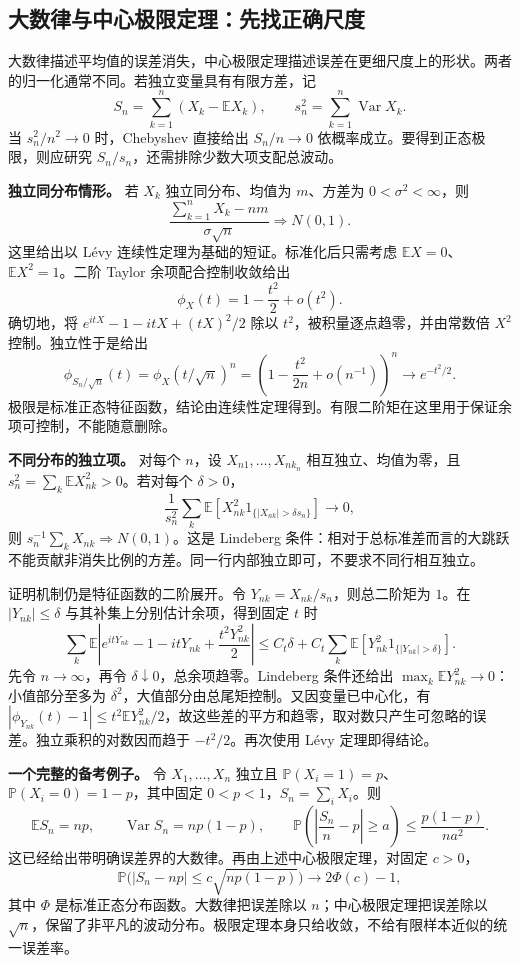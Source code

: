 \subsection{大数律与中心极限定理：先找正确尺度}

\label{app:probability-limit}

大数律描述平均值的误差消失，中心极限定理描述误差在更细尺度上的形状。两者的归一化通常不同。若独立变量具有有限方差，记
\[
S_n=\sum_{k=1}^n(X_k-\mathbb EX_k),\qquad
s_n^2=\sum_{k=1}^n\operatorname{Var}X_k.
\]
当 $s_n^2/n^2\to0$ 时，Chebyshev 直接给出 $S_n/n\to0$ 依概率成立。要得到正态极限，则应研究 $S_n/s_n$，还需排除少数大项支配总波动。

\textbf{独立同分布情形。} 若 $X_k$ 独立同分布、均值为 $m$、方差为 $0<\sigma^2<\infty$，则
\[
\frac{\sum_{k=1}^nX_k-nm}{\sigma\sqrt n}\Rightarrow N(0,1).
\]
这里给出以 Lévy 连续性定理为基础的短证。标准化后只需考虑 $\mathbb EX=0$、$\mathbb EX^2=1$。二阶 Taylor 余项配合控制收敛给出
\[
\phi_X(t)=1-\frac{t^2}{2}+o(t^2).
\]
确切地，将 $e^{itX}-1-itX+(tX)^2/2$ 除以 $t^2$，被积量逐点趋零，并由常数倍 $X^2$ 控制。独立性于是给出
\[
\phi_{S_n/\sqrt n}(t)
=\phi_X(t/\sqrt n)^n
=\left(1-\frac{t^2}{2n}+o(n^{-1})\right)^n
\longrightarrow e^{-t^2/2}.
\]
极限是标准正态特征函数，结论由连续性定理得到。有限二阶矩在这里用于保证余项可控制，不能随意删除。

\textbf{不同分布的独立项。} 对每个 $n$，设 $X_{n1},\ldots,X_{nk_n}$ 相互独立、均值为零，且 $s_n^2=\sum_k\mathbb EX_{nk}^2>0$。若对每个 $\delta>0$，
\[
\frac1{s_n^2}\sum_k\mathbb E\!\left[X_{nk}^2
1_{\{|X_{nk}|>\delta s_n\}}\right]\longrightarrow0,
\]
则 $s_n^{-1}\sum_kX_{nk}\Rightarrow N(0,1)$。这是 Lindeberg 条件：相对于总标准差而言的大跳跃不能贡献非消失比例的方差。同一行内部独立即可，不要求不同行相互独立。

证明机制仍是特征函数的二阶展开。令 $Y_{nk}=X_{nk}/s_n$，则总二阶矩为 $1$。在 $|Y_{nk}|\le\delta$ 与其补集上分别估计余项，得到固定 $t$ 时
\[
\sum_k\mathbb E\left|e^{itY_{nk}}-1-itY_{nk}
+\frac{t^2Y_{nk}^2}{2}\right|
\le C_t\delta+C_t\sum_k\mathbb E[Y_{nk}^2 1_{\{|Y_{nk}|>\delta\}}].
\]
先令 $n\to\infty$，再令 $\delta\downarrow0$，总余项趋零。Lindeberg 条件还给出 $\max_k\mathbb EY_{nk}^2\to0$：小值部分至多为 $\delta^2$，大值部分由总尾矩控制。又因变量已中心化，有 $|\phi_{Y_{nk}}(t)-1|\le t^2\mathbb EY_{nk}^2/2$，故这些差的平方和趋零，取对数只产生可忽略的误差。独立乘积的对数因而趋于 $-t^2/2$。再次使用 Lévy 定理即得结论。

\textbf{一个完整的备考例子。} 令 $X_1,\ldots,X_n$ 独立且 $\mathbb P(X_i=1)=p$、$\mathbb P(X_i=0)=1-p$，其中固定 $0<p<1$，$S_n=\sum_iX_i$。则
\[
\mathbb ES_n=np,\qquad \operatorname{Var}S_n=np(1-p),
\qquad
\mathbb P\!\left(\left|\frac{S_n}{n}-p\right|\ge a\right)
\le\frac{p(1-p)}{na^2}.
\]
这已经给出带明确误差界的大数律。再由上述中心极限定理，对固定 $c>0$，
\[
\mathbb P\bigl(|S_n-np|\le c\sqrt{np(1-p)}\bigr)
\longrightarrow2\Phi(c)-1,
\]
其中 $\Phi$ 是标准正态分布函数。大数律把误差除以 $n$；中心极限定理把误差除以 $\sqrt n$，保留了非平凡的波动分布。极限定理本身只给收敛，不给有限样本近似的统一误差率。

